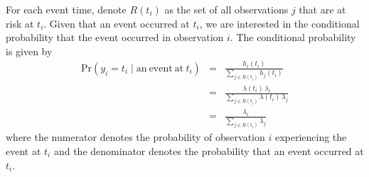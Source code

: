 \begin{itemize}
For each event time, denote $R(t_i)$ as the set of all observations $j$ that are at risk at $t_i$.  Given that an event occurred at $t_i$, we are interested in the conditional probability that the event occurred in observation $i$.  The conditional probability is given by 
\begin{eqnarray*}
\mathrm{Pr}(y_i = t_i \mid \mathrm{an \: event \: at \:}t_i) &=&  \frac{h_i(t_i)}{\sum_{j \in R(t_i)} h_j(t_i)}\\
&=& \frac{\lambda(t_i) \, \lambda_i}{\sum_{j \in R(t_i)} \lambda(t_i) \, \lambda_j}\\
&=& \frac{\lambda_i}{\sum_{j \in R(t_i)} \lambda_j}
\end{eqnarray*}
where the numerator denotes the probability of observation $i$ experiencing the event at $t_i$ and the denominator denotes the probability that an event occurred at $t_i$.  
%
%


\end{itemize}
